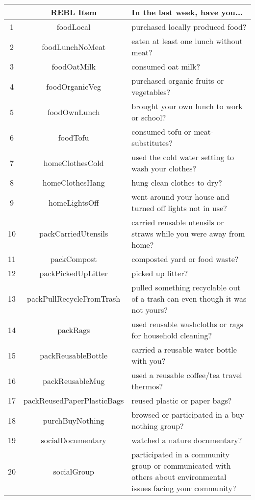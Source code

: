 \begin{table}[ht]
\centering
\begingroup\footnotesize
\begin{tabular}{ccp{7cm}}
  \hline
 & REBL Item & In the last week, have you... \\ 
  \hline
1 & foodLocal & purchased locally produced food? \\ 
  2 & foodLunchNoMeat & eaten at least one lunch without meat? \\ 
  3 & foodOatMilk & consumed oat milk? \\ 
  4 & foodOrganicVeg & purchased organic fruits or vegetables? \\ 
  5 & foodOwnLunch & brought your own lunch to work or school? \\ 
  6 & foodTofu & consumed tofu or meat-substitutes? \\ 
  7 & homeClothesCold & used the cold water setting to wash your clothes? \\ 
  8 & homeClothesHang & hung clean clothes to dry? \\ 
  9 & homeLightsOff & went around your house and turned off lights not in use? \\ 
  10 & packCarriedUtensils & carried reusable utensils or straws while you were away from home? \\ 
  11 & packCompost & composted yard or food waste? \\ 
  12 & packPickedUpLitter & picked up litter? \\ 
  13 & packPullRecycleFromTrash & pulled something recyclable out of a trash can even though it was not yours? \\ 
  14 & packRags & used reusable washcloths or rags for household cleaning? \\ 
  15 & packReusableBottle & carried a reusable water bottle with you? \\ 
  16 & packReusableMug & used a reusable coffee/tea travel thermos? \\ 
  17 & packReusedPaperPlasticBags & reused plastic or paper bags? \\ 
  18 & purchBuyNothing & browsed or participated in a buy-nothing group? \\ 
  19 & socialDocumentary & watched a nature documentary? \\ 
  20 & socialGroup & participated in a community group or communicated with others about environmental issues facing your community? \\ 

\end{tabular}
\end{table}
